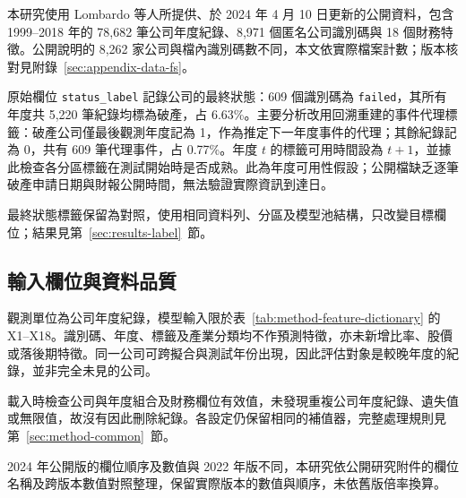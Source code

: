 本研究使用 Lombardo 等人\autocite{lombardo2022bankruptcy}所提供、於 2024 年 4 月 10 日更新的公開資料\autocite{sowide-bankruptcy-data}，包含 1999--2018 年的 78,682 筆公司年度紀錄、8,971 個匿名公司識別碼與 18 個財務特徵。公開說明的 8,262 家公司與檔內識別碼數不同，本文依實際檔案計數；版本核對見附錄~\ref{sec:appendix-data-fs}。

原始欄位 \nolinkurl{status_label} 記錄公司的最終狀態：609 個識別碼為 \nolinkurl{failed}，其所有年度共 5,220 筆紀錄均標為破產，占 6.63\%。主要分析改用回溯重建的事件代理標籤：破產公司僅最後觀測年度記為 1，作為推定下一年度事件的代理；其餘紀錄記為 0，共有 609 筆代理事件，占 0.77\%。年度 \(t\) 的標籤可用時間設為 \(t+1\)，並據此檢查各分區標籤在測試開始時是否成熟。此為年度可用性假設；公開檔缺乏逐筆破產申請日期與財報公開時間，無法驗證實際資訊到達日。

最終狀態標籤保留為對照，使用相同資料列、分區及模型池結構，只改變目標欄位；結果見第~\ref{sec:results-label}~節。

\subsection{輸入欄位與資料品質}

觀測單位為公司年度紀錄，模型輸入限於表~\ref{tab:method-feature-dictionary} 的 X1--X18。識別碼、年度、標籤及產業分類均不作預測特徵，亦未新增比率、股價或落後期特徵。同一公司可跨擬合與測試年份出現，因此評估對象是較晚年度的紀錄，並非完全未見的公司。

載入時檢查公司與年度組合及財務欄位有效值，未發現重複公司年度紀錄、遺失值或無限值，故沒有因此刪除紀錄。各設定仍保留相同的補值器，完整處理規則見第~\ref{sec:method-common}~節。

2024 年公開版的欄位順序及數值與 2022 年版不同，本研究依公開研究附件的欄位名稱及跨版本數值對照整理\autocite{sowide-financial-supplement}，保留實際版本的數值與順序，未依舊版倍率換算。

